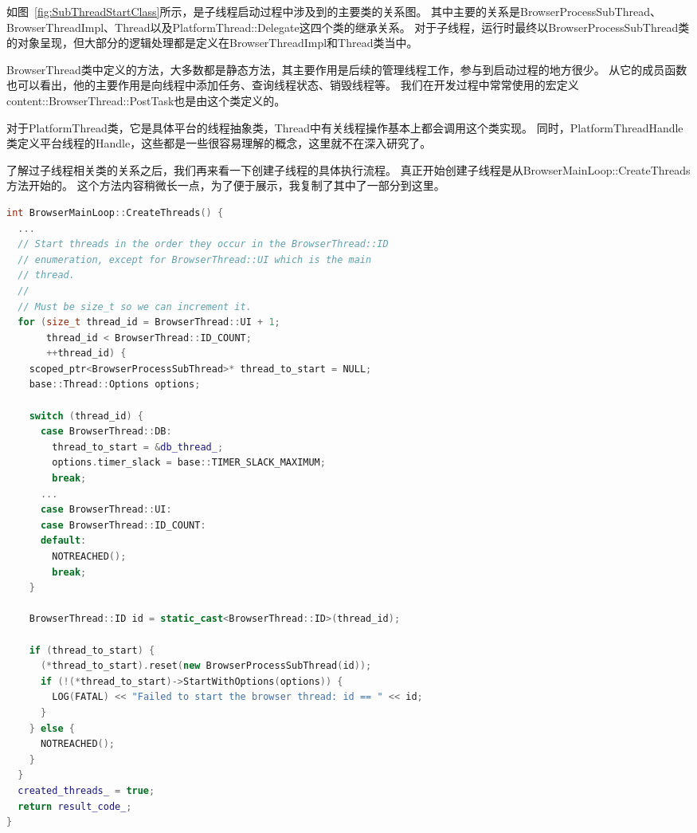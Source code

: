 如图~\ref{fig:SubThreadStartClass}所示，是子线程启动过程中涉及到的主要类的关系图。
其中主要的关系是BrowserProcessSubThread、BrowserThreadImpl、Thread以及PlatformThread::Delegate这四个类的继承关系。
对于子线程，运行时最终以BrowserProcessSubThread类的对象呈现，但大部分的逻辑处理都是定义在BrowserThreadImpl和Thread类当中。

BrowserThread类中定义的方法，大多数都是静态方法，其主要作用是后续的管理线程工作，参与到启动过程的地方很少。
从它的成员函数也可以看出，他的主要作用是向线程中添加任务、查询线程状态、销毁线程等。
我们在开发过程中常常使用的宏定义content::BrowserThread::PostTask也是由这个类定义的。

对于PlatformThread类，它是具体平台的线程抽象类，Thread中有关线程操作基本上都会调用这个类实现。
同时，PlatformThreadHandle类定义平台线程的Handle，这些都是一些很容易理解的概念，这里就不在深入研究了。

了解过子线程相关类的关系之后，我们再来看一下创建子线程的具体执行流程。
真正开始创建子线程是从BrowserMainLoop::CreateThreads方法开始的。
这个方法内容稍微长一点，为了便于展示，我复制了其中了一部分到这里。

\begin{spacing}{1.0}
\begin{lstlisting}[language={C++}]
int BrowserMainLoop::CreateThreads() {
  ...
  // Start threads in the order they occur in the BrowserThread::ID
  // enumeration, except for BrowserThread::UI which is the main
  // thread.
  //
  // Must be size_t so we can increment it.
  for (size_t thread_id = BrowserThread::UI + 1;
       thread_id < BrowserThread::ID_COUNT;
       ++thread_id) {
    scoped_ptr<BrowserProcessSubThread>* thread_to_start = NULL;
    base::Thread::Options options;

    switch (thread_id) {
      case BrowserThread::DB:
        thread_to_start = &db_thread_;
        options.timer_slack = base::TIMER_SLACK_MAXIMUM;
        break;
      ...
      case BrowserThread::UI:
      case BrowserThread::ID_COUNT:
      default:
        NOTREACHED();
        break;
    }

    BrowserThread::ID id = static_cast<BrowserThread::ID>(thread_id);
    
    if (thread_to_start) {
      (*thread_to_start).reset(new BrowserProcessSubThread(id));
      if (!(*thread_to_start)->StartWithOptions(options)) {
        LOG(FATAL) << "Failed to start the browser thread: id == " << id;
      }
    } else {
      NOTREACHED();
    }
  }
  created_threads_ = true;
  return result_code_;
}
\end{lstlisting}
\end{spacing}

